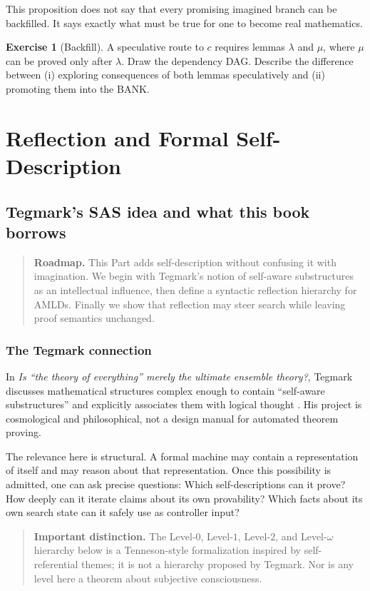 \documentclass[11pt,openany]{book}
\theoremstyle{definition}
\newtheorem{exercise}[theorem]{Exercise}
\theoremstyle{remark}
\newenvironment{roadmap}{\begin{quote}\small\color{deepblue}\textbf{Roadmap.} }{\end{quote}}
\newenvironment{warningbox}{\begin{quote}\small\color{red!50!black}\textbf{Important distinction.} }{\end{quote}}
\begin{document}
This proposition does not say that every promising imagined branch can be backfilled. It says exactly what must be true for one to become real mathematics.

\begin{exercise}[Backfill]\label{ex:backfill}
A speculative route to $c$ requires lemmas $\lambda$ and $\mu$, where $\mu$ can be proved only after $\lambda$. Draw the dependency DAG. Describe the difference between (i) exploring consequences of both lemmas speculatively and (ii) promoting them into the BANK.
\end{exercise}

\part{Reflection and Formal Self-Description}

\chapter{Tegmark's SAS idea and what this book borrows}
\begin{roadmap}
This Part adds self-description without confusing it with imagination. We begin with Tegmark's notion of self-aware substructures as an intellectual influence, then define a syntactic reflection hierarchy for AMLDs. Finally we show that reflection may steer search while leaving proof semantics unchanged.
\end{roadmap}

\section{The Tegmark connection}
In \emph{Is ``the theory of everything'' merely the ultimate ensemble theory?}, Tegmark discusses mathematical structures complex enough to contain ``self-aware substructures'' and explicitly associates them with logical thought \cite{Tegmark1998}. His project is cosmological and philosophical, not a design manual for automated theorem proving.

The relevance here is structural. A formal machine may contain a representation of itself and may reason about that representation. Once this possibility is admitted, one can ask precise questions: Which self-descriptions can it prove? How deeply can it iterate claims about its own provability? Which facts about its own search state can it safely use as controller input?

\begin{warningbox}
The Level-$0$, Level-$1$, Level-$2$, and Level-$\omega$ hierarchy below is a Tenneson-style formalization inspired by self-referential themes; it is not a hierarchy proposed by Tegmark. Nor is any level here a theorem about subjective consciousness.
\end{warningbox}
\end{document}
